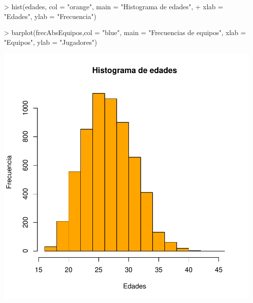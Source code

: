 \documentclass [a4paper] {article}
\begin{document}
\begin{Schunk}
\begin{Sinput}
> hist(edades, col = "orange", main = "Histograma de edades",
+      xlab = "Edades", ylab = "Frecuencia")
\end{Sinput}
\end{Schunk}

\begin{Schunk}
\begin{Sinput}
> barplot(frecAbsEquipos,col = "blue", main = "Frecuencias de equipos",  xlab = "Equipos", ylab = "Jugadores")
\end{Sinput}
\end{Schunk}

\begin{center}
\includegraphics{Practica1-030}
\end{center}
\end{document}

